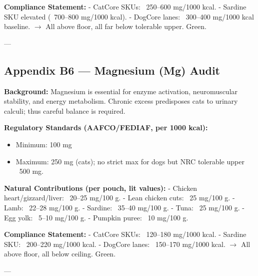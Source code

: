 \textbf{Compliance Statement:}  
- CatCore SKUs: ~250--600 mg/1000 kcal.  
- Sardine SKU elevated (~700--800 mg/1000 kcal).  
- DogCore lanes: ~300--400 mg/1000 kcal baseline.  
$\rightarrow$ All above floor, all far below tolerable upper. Green.

---

\subsection*{Appendix B6 --- Magnesium (Mg) Audit}

\textbf{Background:}  
Magnesium is essential for enzyme activation, neuromuscular stability, and energy metabolism. Chronic excess predisposes cats to urinary calculi; thus careful balance is required.  

\textbf{Regulatory Standards (AAFCO/FEDIAF, per 1000 kcal):}  
\begin{itemize}[leftmargin=1.2em]
  \item Minimum: 100 mg  
  \item Maximum: 250 mg (cats); no strict max for dogs but NRC tolerable upper ~500 mg.  
\end{itemize}

\textbf{Natural Contributions (per pouch, lit values):}  
- Chicken heart/gizzard/liver: ~20--25 mg/100 g.  
- Lean chicken cuts: ~25 mg/100 g.  
- Lamb: ~22--28 mg/100 g.  
- Sardine: ~35--40 mg/100 g.  
- Tuna: ~25 mg/100 g.  
- Egg yolk: ~5--10 mg/100 g.  
- Pumpkin puree: ~10 mg/100 g.  

\textbf{Compliance Statement:}  
- CatCore SKUs: ~120--180 mg/1000 kcal.  
- Sardine SKU: ~200--220 mg/1000 kcal.  
- DogCore lanes: ~150--170 mg/1000 kcal.  
$\rightarrow$ All above floor, all below ceiling. Green.

---
